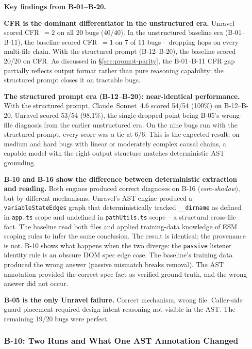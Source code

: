 \documentclass[12pt,a4paper]{article}
\newcommand{\code}[1]{\texttt{\small #1}}
\begin{document}
\begin{findingbox}
\textbf{Key findings from B-01--B-20.}

\textbf{CFR is the dominant differentiator in the unstructured era.} Unravel scored
CFR~$=2$ on all 20 bugs (40/40). In the unstructured baseline era (B-01--B-11), the
baseline scored CFR~$=1$ on 7 of 11 bugs -- dropping hops on every multi-file chain.
With the structured prompt (B-12--B-20), the baseline scored 20/20 on CFR. As discussed
in \S\ref{sec:prompt-parity}, the B-01--B-11 CFR gap partially reflects output format
rather than pure reasoning capability; the structured prompt closes it on tractable bugs.

\textbf{The structured prompt era (B-12--B-20): near-identical performance.}
With the structured prompt, Claude~Sonnet~4.6 scored 54/54 (100\%) on B-12--B-20.
Unravel scored 53/54 (98.1\%), the single dropped point being B-05's wrong-file
diagnosis from the earlier unstructured era. On the nine bugs run with the structured
prompt, every score was a tie at 6/6. This is the expected result: on medium and hard
bugs with linear or moderately complex causal chains, a capable model with the right
output structure matches deterministic AST grounding.

\textbf{B-10 and B-16 show the difference between deterministic extraction and reading.}
Both engines produced correct diagnoses on B-16 (\textit{esm-shadow}), but by
different mechanisms. Unravel's AST engine produced a \code{variableStateEdges} graph
that deterministically tracked \code{\_\_dirname} as defined in \code{app.ts} scope and
undefined in \code{pathUtils.ts} scope -- a structural cross-file fact. The baseline
read both files and applied training-data knowledge of ESM scoping rules to infer the
same conclusion. The result is identical; the provenance is not. B-10 shows what happens
when the two diverge: the \code{passive} listener identity rule is an obscure DOM spec
edge case. The baseline's training data produced the wrong answer (passive mismatch
breaks removal). The AST annotation provided the correct spec fact as verified ground
truth, and the wrong answer did not occur.

\textbf{B-05 is the only Unravel failure.} Correct mechanism, wrong file.
Caller-side guard placement required design-intent reasoning not visible in the AST.
The remaining 19/20 bugs were perfect.
\end{findingbox}

\subsubsection{B-10: Two Runs and What One AST Annotation Changed}
\label{sec:b10-two-runs}
\end{document}
